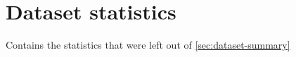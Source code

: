 \chapter{Dataset statistics}
\label{appendix:dataset}
Contains the statistics that were left out of \ref{sec:dataset-summary}